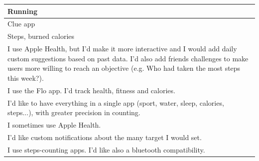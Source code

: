 \documentclass{article}
\begin{document}
\begin{table}[H]
\begin{tabularx}{0.9\textwidth}{X}
		\hline
		Running                                                                                                                                                                                                                                                                    \\
		\hline
		Clue app                                                                                                                                                                                                                                                                   \\
		\hline
		Steps, burned calories                                                                                                                                                                                                                                                     \\
		\hline
		I use Apple Health, but I'd make it more interactive and I would add daily custom suggestions based on past data. I'd also add friends challenges to make users more willing to reach an objective (e.g. Who had taken the most steps this week?).                         \\
		\hline
		I use the Flo app. I'd track health, fitness and calories.                                                                                                                                                                                                                 \\
		\hline
		I'd like to have everything in a single app (sport, water, sleep, calories, steps...), with greater precision in counting.                                                                                                                                                 \\
		\hline
		I sometimes use Apple Health.                                                                                                                                                                                                                                              \\
		\hline
		I'd like custom notifications about the many target I would set.                                                                                                                                                                                                           \\
		\hline
		I use steps-counting apps. I'd like also a bluetooth compatibility.                                                                                                                                                                                                        \\

\end{tabularx}
\end{table}
\end{document}
